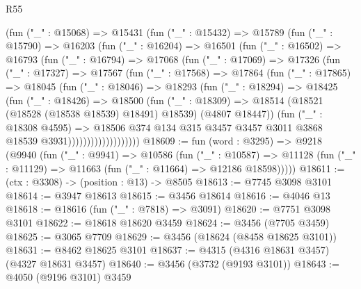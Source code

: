 \begin{lexlean}{R55}
\begin{coremodule}
              (fun ("_" : @15068) =>
              @15431
                (fun ("_" : @15432) =>
                @15789
                  (fun ("_" : @15790) =>
                  @16203
                    (fun ("_" : @16204) =>
                    @16501
                      (fun ("_" : @16502) =>
                      @16793
                        (fun ("_" : @16794) =>
                        @17068
                          (fun ("_" : @17069) =>
                          @17326
                            (fun ("_" : @17327) =>
                            @17567
                              (fun ("_" : @17568) =>
                              @17864
                                (fun ("_" : @17865) =>
                                @18045
                                  (fun ("_" : @18046) =>
                                  @18293
                                    (fun ("_" : @18294) =>
                                    @18425
                                      (fun ("_" : @18426) =>
                                      @18500
                                        (fun ("_" : @18309) =>
                                        @18514
                                          (@18521 (@18528 (@18538 @18539) @18491) @18539)
                                          (@4807 @18447))
                                        (fun ("_" : @18308 @4595) =>
                                        @18506
                                          @374
                                          @134
                                          @315
                                          @3457
                                          @3457
                                          @3011
                                          @3868
                                          @18539
                                          @3931)))))))))))))))))))
@18609 := fun (word : @3295) =>
  @9218
    (@9940
      (fun ("_" : @9941) =>
      @10586
        (fun ("_" : @10587) =>
        @11128 (fun ("_" : @11129) => @11663 (fun ("_" : @11664) => @12186 @18598)))))
@18611 := (ctx : @3308) -> (position : @13) -> @8505
@18613 := @7745 @3098 @3101
@18614 := @3947 @18613
@18615 := @3456 @18614
@18616 := @4046 @13
@18618 := @18616 (fun ("_" : @7818) => @3091)
@18620 := @7751 @3098 @3101
@18622 := @18618 @18620 @3459
@18624 := @3456 (@7705 @3459)
@18625 := @3065 @7709
@18629 := @3456 (@18624 (@8458 @18625 @3101))
@18631 := @8462 @18625 @3101
@18637 := @4315 (@4316 @18631 @3457) (@4327 @18631 @3457)
@18640 := @3456 (@3732 (@9193 @3101))
@18643 := @4050 (@9196 @3101) @3459

\end{coremodule}
\end{lexlean}
